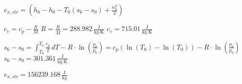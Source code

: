 \( e_{x,str} = (h_6 - h_0 - T_0 (s_6 - s_0) + \frac{w_6^2}{2}) \)  

\( c_v = c_p - \frac{R}{M} \)  
\( R = \frac{\bar{R}}{\bar{M}} = 288.982 \, \frac{\text{J}}{\text{kg·K}} \)  
\( c_v = 715.01 \, \frac{\text{J}}{\text{kg·K}} \)  

\( s_6 - s_0 = \int_{T_0}^{T_6} \frac{c_p}{T} \, dT - R \cdot \ln \left( \frac{p_6}{p_0} \right) = c_p \left( \ln(T_6) - \ln(T_0) \right) - R \cdot \ln \left( \frac{p_6}{p_0} \right) \)  
\( s_6 - s_0 = 301.361 \, \frac{\text{J}}{\text{kg·K}} \)  

\( e_{x,str} = 156239.168 \, \frac{\text{J}}{\text{kg}} \)